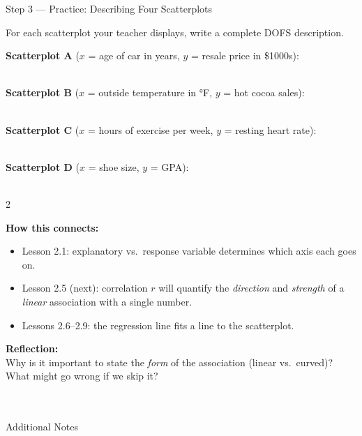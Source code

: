 \documentclass[10pt]{article}
\begin{document}
\begin{notesbox}{Step 3 --- Practice: Describing Four Scatterplots}
\small

\noindent For each scatterplot your teacher displays, write a complete DOFS description.

\vspace{6pt}
\textbf{Scatterplot A} ($x$ = age of car in years, $y$ = resale price in \$1000s):\\[6pt]
\writeline\\[1pt]\writeline

\vspace{6pt}
\textbf{Scatterplot B} ($x$ = outside temperature in °F, $y$ = hot cocoa sales):\\[6pt]
\writeline\\[1pt]\writeline

\vspace{6pt}
\textbf{Scatterplot C} ($x$ = hours of exercise per week, $y$ = resting heart rate):\\[6pt]
\writeline\\[1pt]\writeline

\vspace{6pt}
\textbf{Scatterplot D} ($x$ = shoe size, $y$ = GPA):\\[6pt]
\writeline\\[1pt]\writeline
\end{notesbox}

\vspace{0.1in}

\begin{spiralbox}
\small
\begin{multicols}{2}

\textbf{How this connects:}
\begin{itemize}[itemsep=3pt]
  \item Lesson 2.1: explanatory vs.\ response variable determines which axis each goes on.
  \item Lesson 2.5 (next): correlation $r$ will quantify the \emph{direction} and \emph{strength}
        of a \textit{linear} association with a single number.
  \item Lessons 2.6--2.9: the regression line fits a line to the scatterplot.
\end{itemize}

\columnbreak

\textbf{Reflection:}\\
Why is it important to state the \emph{form} of the association (linear vs.\ curved)?
What might go wrong if we skip it?\\[2pt]
\writeline\\[1pt]\writeline\\[1pt]\writeline

\end{multicols}
\end{spiralbox}

\vspace{0.1in}

\begin{notesbox}{Additional Notes}
\vspace{0pt}
\writeline\\\writeline\\\writeline\\\writeline\\\writeline\\\writeline
\end{notesbox}
\end{document}
